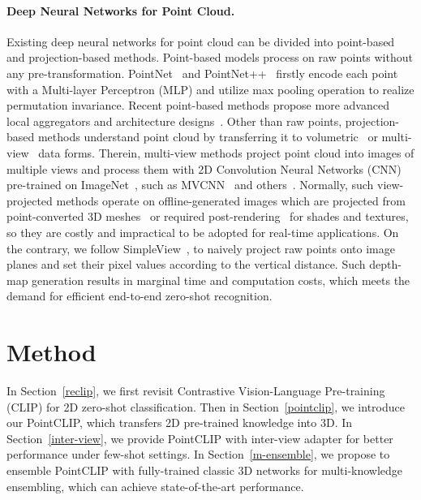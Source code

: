 \documentclass[10pt,twocolumn,letterpaper]{article}
\begin{document}
\paragraph{Deep Neural Networks for Point Cloud.}
Existing deep neural networks for point cloud can be divided into point-based and projection-based methods. Point-based models process on raw points without any pre-transformation.
PointNet~\cite{qi2017pointnet} and PointNet++~\cite{qi2017pointnet++} firstly encode each point with a Multi-layer Perceptron (MLP) and utilize max pooling operation to realize permutation invariance. Recent point-based methods propose more advanced local aggregators and architecture designs~\cite{li2018pointcnn,thomas2019kpconv}. Other than raw points, projection-based methods understand point cloud by transferring it to volumetric~\cite{maturana2015voxnet} or multi-view~\cite{su2015multi} data forms. 
Therein, multi-view methods project point cloud into images of multiple views and process them with 2D Convolution Neural Networks (CNN)~\cite{he2016deep} pre-trained on ImageNet~\cite{krizhevsky2012imagenet}, such as MVCNN~\cite{su2015multi} and others~\cite{feng2018gvcnn, kanezaki2018rotationnet,yu2018mattnet,feng2019hypergraph}. Normally, such view-projected methods operate on offline-generated images which are projected from point-converted 3D meshes~\cite{wang20183d} or required post-rendering~\cite{sarkar2018learning} for shades and textures, so they are costly and impractical to be adopted for real-time applications. On the contrary, we follow SimpleView~\cite{goyal2021revisiting}, to naively project raw points onto image planes and set their pixel values according to the vertical distance. Such depth-map generation results in marginal time and computation costs, which meets the demand for efficient end-to-end zero-shot recognition.

\vspace*{-2pt}
\section{Method}
\label{sec:method}
In Section~\ref{reclip}, we first revisit Contrastive Vision-Language Pre-training (CLIP) for 2D zero-shot classification. Then in Section~\ref{pointclip}, we introduce our PointCLIP, which transfers 2D pre-trained knowledge into 3D. In Section~\ref{inter-view}, we provide PointCLIP with inter-view adapter for better performance under few-shot settings. In Section~\ref{m-ensemble}, we propose to ensemble PointCLIP with fully-trained classic 3D networks for multi-knowledge ensembling, which can achieve state-of-the-art performance.
\end{document}
